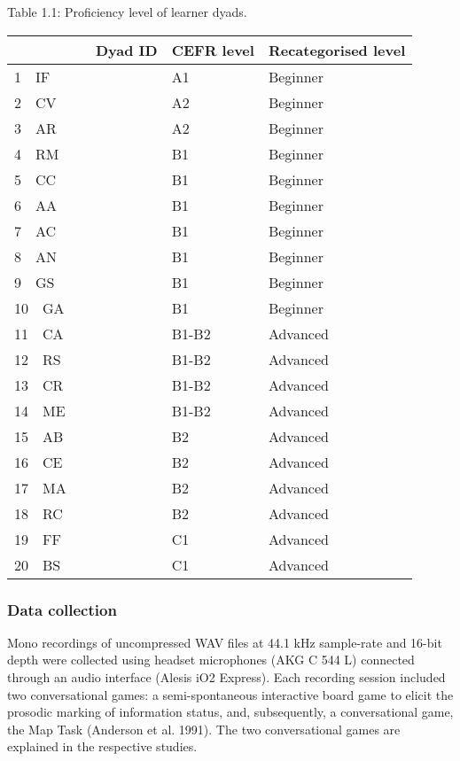 \begin{stylelsTableHeading}
Table 1.1: Proficiency level of learner dyads.
\end{stylelsTableHeading}

\begin{flushleft}
\tablefirsthead{}
\tablehead{}
\tabletail{}
\tablelasttail{}
\begin{supertabular}{m{1.2129599in}m{1.2129599in}m{1.2136599in}}
\hline
\textbf{\ \ \ \ \ \ \ \ \ \ Dyad ID} &
\textbf{CEFR level} &
\textbf{Recategorised }\textbf{level}\\\ \ IF &
A1 &
Beginner\\
2\ \ CV &
A2 &
Beginner\\
3\ \ AR &
A2 &
Beginner\\
4\ \ RM &
B1 &
Beginner\\
5\ \ CC &
B1 &
Beginner\\
6\ \ AA &
B1 &
Beginner\\
7\ \ AC &
B1 &
Beginner\\
8\ \ AN &
B1 &
Beginner\\
9\ \ GS &
B1 &
Beginner\\
10\ \ GA &
B1 &
Beginner\\
11\ \ CA &
B1-B2 &
Advanced\\
12\ \ RS &
B1-B2 &
Advanced\\
13\ \ CR &
B1-B2 &
Advanced\\
14\ \ ME &
B1-B2 &
Advanced\\
15\ \ AB &
B2 &
Advanced\\
16\ \ CE &
B2 &
Advanced\\
17\ \ MA &
B2 &
Advanced\\
18\ \ RC &
B2 &
Advanced\\
19\ \ FF &
C1 &
Advanced\\
20\ \ BS &
C1 &
Advanced\\
\end{supertabular}
\end{flushleft}
\subsubsection{Data collection}
\hypertarget{Toc191305880}{}\begin{styleStandard}
Mono recordings of uncompressed WAV files at 44.1 kHz sample-rate and 16-bit depth were collected using headset microphones (AKG C 544 L) connected through an audio interface (Alesis iO2 Express). Each recording session included two conversational games: a semi-spontaneous interactive board game to elicit the prosodic marking of information status, and, subsequently, a conversational game, the Map Task (Anderson et al. 1991). The two conversational games are explained in the respective studies.
\end{styleStandard}

